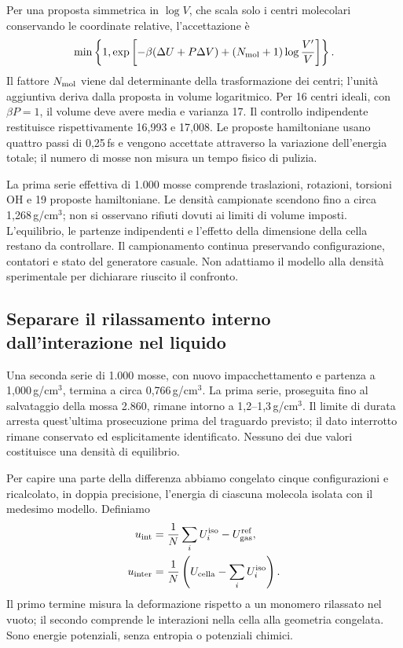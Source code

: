 \documentclass[11pt,reqno]{amsart}
\numberwithin{equation}{section}
\begin{document}
Per una proposta simmetrica in $\log V$, che scala solo i
centri molecolari conservando le coordinate relative,
l'accettazione \`e
\begin{equation}
 \min\left\{1,\exp\left[-\beta(\Delta U+P\Delta V)
 +(N_{\rm mol}+1)\log\frac{V'}{V}\right]\right\}.
\end{equation}
Il fattore $N_{\rm mol}$ viene dal determinante della
trasformazione dei centri; l'unit\`a aggiuntiva deriva dalla
proposta in volume logaritmico. Per 16 centri ideali, con
$\beta P=1$, il volume deve avere media e varianza 17.
Il controllo indipendente restituisce rispettivamente 16,993
e 17,008. Le proposte hamiltoniane usano quattro passi di
0,25\,fs e vengono accettate attraverso la variazione
dell'energia totale; il numero di mosse non misura un tempo
fisico di pulizia.

La prima serie effettiva di 1.000 mosse comprende
traslazioni, rotazioni, torsioni OH e 19 proposte hamiltoniane.
Le densit\`a campionate scendono fino a circa 1,268\,g/cm$^3$;
non si osservano rifiuti dovuti ai limiti di volume imposti.
L'equilibrio, le partenze indipendenti e l'effetto della
dimensione della cella restano da controllare. Il campionamento
continua preservando configurazione, contatori e stato del
generatore casuale. Non adattiamo il modello alla densit\`a
sperimentale per dichiarare riuscito il confronto.

\subsection{Separare il rilassamento interno dall'interazione nel liquido}

Una seconda serie di 1.000 mosse, con nuovo impacchettamento e
partenza a 1,000\,g/cm$^3$, termina a circa 0,766\,g/cm$^3$.
La prima serie, proseguita fino al salvataggio della mossa 2.860,
rimane intorno a 1,2--1,3\,g/cm$^3$. Il limite di durata arresta
quest'ultima prosecuzione prima del traguardo previsto; il dato
interrotto rimane conservato ed esplicitamente identificato.
Nessuno dei due valori costituisce una densit\`a di equilibrio.

Per capire una parte della differenza abbiamo congelato cinque
configurazioni e ricalcolato, in doppia precisione, l'energia
di ciascuna molecola isolata con il medesimo modello. Definiamo
\begin{align}
 u_{\rm int}&=\frac1N\sum_i U_i^{\rm iso}-U_{\rm gas}^{\rm ref},\\
 u_{\rm inter}&=\frac1N\left(U_{\rm cella}-\sum_i U_i^{\rm iso}\right).
\end{align}
Il primo termine misura la deformazione rispetto a un monomero
rilassato nel vuoto; il secondo comprende le interazioni nella
cella alla geometria congelata. Sono energie potenziali,
senza entropia o potenziali chimici.
\end{document}
